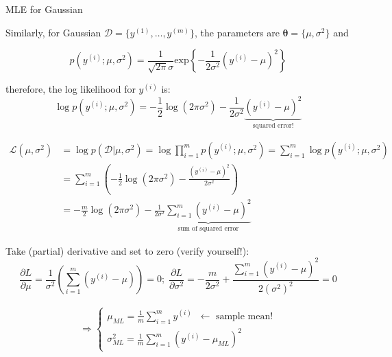 \documentclass[ignorenonframetext,]{beamer}
\newcommand{\Gaussian}[3]{\ensuremath{\frac{1}{\sqrt{2\pi}#3}
\text{exp}\left \{-\frac{1}{2#3^2} (#1-#2)^2 \right \}}}
\newcommand{\vv}[1]{\boldsymbol{#1}}
\newcommand{\di}[2]{\ensuremath{ #1^{(#2)}}}
\begin{document}
\begin{frame}{MLE for Gaussian}
\protect\hypertarget{mle-for-gaussian}{}

Similarly, for Gaussian
\(\mathcal{D}=\{\di{y}{1}, \ldots, \di{y}{m}\}\), the parameters are
\(\vv{\theta} = \{\mu, \sigma^2\}\) and

\[p(\di{y}{i}; \mu, \sigma^2) = \Gaussian{\di{y}{i}}{\mu}{\sigma}\]

therefore, the log likelihood for \(\di{y}{i}\) is:
\[\log p(\di{y}{i}; \mu, \sigma^2) = -\frac{1}{2} \log(2\pi\sigma^2) -\frac{1}{2\sigma^2}\underbrace{(\di{y}{i}-\mu)^2}_{\text{squared error!}}\]

\end{frame}

\begin{frame}{}
\protect\hypertarget{section}{}

\begin{align}
  \mathcal{L}(\mu, \sigma^2) &= \log p(\mathcal{D}|\mu, \sigma^2) = \log \prod_{i=1}^m p(\di{y}{i}; \mu, \sigma^2) = \sum_{i=1}^m \log p(\di{y}{i};\mu, \sigma^2)  \nonumber \\ &= \sum_{i=1}^m \left(-\frac{1}{2} \log(2\pi\sigma^2) -\frac{(\di{y}{i}-\mu)^2}{2\sigma^2}\right ) \nonumber \\
  &= -\frac{m}{2}\log(2\pi \sigma^2)- \frac{1}{2\sigma^2} \underbrace{\sum_{i=1}^m (\di{y}{i}-\mu)^2}_{\text{sum of squared error}} \nonumber
  \end{align}

Take (partial) derivative and set to zero (verify yourself!):
\[\frac{\partial L}{\partial \mu} =  \frac{1}{\sigma^2} \left (\sum_{i=1}^m (\di{y}{i}-\mu)\right) = 0; \;
\frac{\partial L}{\partial \sigma^2} =-\frac{m}{2\sigma^2} +\frac{\sum_{i=1}^m(\di{y}{i} -\mu)^2}{2(\sigma^2)^2}  = 0\]

\begin{align*} 
\Rightarrow \begin{cases} \mu_{ML} = \frac{1}{m}\sum_{i=1}^m \di{y}{i} \;\; \leftarrow \text{ sample mean!} \\
\sigma^2_{ML} = \frac{1}{m}\sum_{i=1}^m(\di{y}{i}-\mu_{ML})^2
\end{cases}
\end{align*}

\end{frame}
\end{document}

